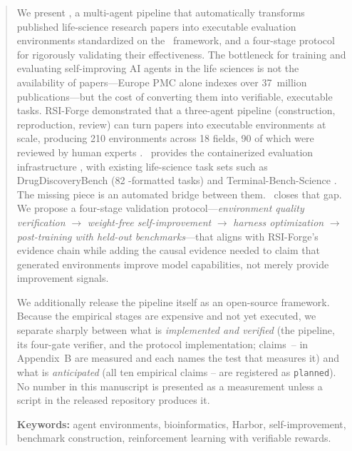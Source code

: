 \begin{abstract}

We present \sys, a multi-agent pipeline that automatically transforms published
life-science research papers into executable evaluation environments
standardized on the \harbor\ framework, and a four-stage protocol for
rigorously validating their effectiveness. The bottleneck for training and
evaluating self-improving AI agents in the life sciences is not the
availability of papers---Europe PMC alone indexes over 37~million
publications---but the cost of converting them into verifiable, executable
tasks. RSI-Forge demonstrated that a three-agent pipeline (construction,
reproduction, review) can turn papers into executable environments at scale,
producing 210 environments across 18 fields, 90 of which were reviewed by human
experts \cite{rsi-forge}. \harbor\ provides the containerized evaluation
infrastructure \cite{harbor}, with existing life-science task sets such as
DrugDiscoveryBench (82 \harbor-formatted tasks) \cite{drugdiscoverybench} and
Terminal-Bench-Science \cite{tbscience}. The missing piece is an automated
bridge between them. \sys\ closes that gap. We propose a four-stage validation
protocol---\emph{environment quality verification} $\rightarrow$
\emph{weight-free self-improvement} $\rightarrow$ \emph{harness optimization}
$\rightarrow$ \emph{post-training with held-out benchmarks}---that aligns with
RSI-Forge's evidence chain while adding the causal evidence needed to claim
that generated environments improve model capabilities, not merely provide
improvement signals.

We additionally release the pipeline itself as an open-source framework.
Because the empirical stages are expensive and not yet executed, we separate
sharply between what is \emph{implemented and verified} (the pipeline, its
four-gate verifier, and the protocol implementation; claims~--
in Appendix~B are measured and each names the test that measures it) and what
is \emph{anticipated} (all ten empirical claims -- are
registered as \texttt{planned}). No number in this manuscript is presented as a
measurement unless a script in the released repository produces it.

\bigskip
\noindent\textbf{Keywords:} agent environments, bioinformatics, Harbor,
self-improvement, benchmark construction, reinforcement learning with
verifiable rewards.

\end{abstract}
